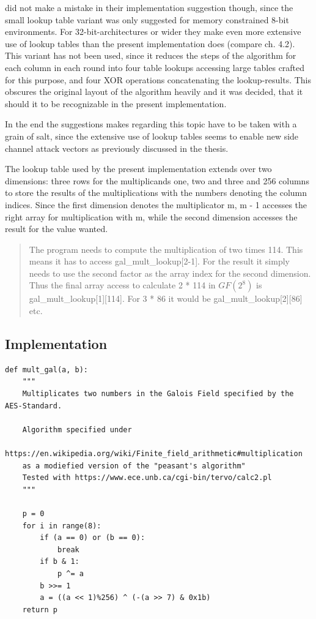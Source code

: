 \cite{rijndael} did not
make a mistake in their implementation suggestion though, since the
small lookup table variant was only suggested for memory constrained
8-bit environments. For 32-bit-architectures or wider they make even more
extensive use of lookup tables than the present implementation does
(compare ch. 4.2). This variant has not been used, since it reduces the
steps of the algorithm for each column in each round into four table
lookups accessing large tables crafted for this purpose, and four XOR
operations concatenating the lookup-results. This obscures the original
layout of the algorithm heavily and it was decided, that it should it to be recognizable
in the present implementation.

In the end the suggestions \cite{rijndael} makes regarding this topic have to
be taken with a grain of salt, since the extensive use of lookup tables
seems to enable new side channel attack vectors as previously discussed in the thesis.

The lookup table used by the present implementation extends over two
dimensions: three rows for the multiplicands one, two and three and 256
columns to store the results of the multiplications with the numbers
denoting the column indices. Since the first dimension denotes the
multiplicator m, m - 1 accesses the right array for multiplication with
m, while the second dimension accesses the result for the value wanted.

\begin{quote}
The program needs to compute the multiplication of two times 114. This
means it has to access gal\_mult\_lookup[2-1]. For the result it
simply needs to use the second factor as the array index for the second
dimension. Thus the final array access to calculate 2 * 114 in $GF(2^{8})$ is
gal\_mult\_lookup[1][114]. For 3 * 86 it would be
gal\_mult\_lookup[2][86] etc.
\end{quote}

\hypertarget{implementation}{%
\subsection{Implementation}\label{implementation}}

\begin{lstlisting}
def mult_gal(a, b):
    """
    Multiplicates two numbers in the Galois Field specified by the AES-Standard.

    Algorithm specified under
    https://en.wikipedia.org/wiki/Finite_field_arithmetic#multiplication
    as a modiefied version of the "peasant's algorithm"
    Tested with https://www.ece.unb.ca/cgi-bin/tervo/calc2.pl
    """

    p = 0
    for i in range(8):
        if (a == 0) or (b == 0):
            break
        if b & 1:
            p ^= a
        b >>= 1
        a = ((a << 1)%256) ^ (-(a >> 7) & 0x1b)
    return p
\end{lstlisting}

